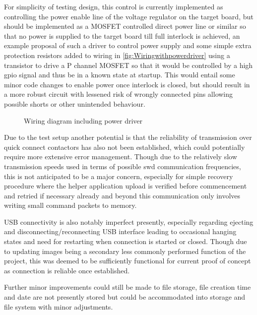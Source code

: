  For simplicity of testing design, this control is currently implemented as controlling the power enable line of the voltage regulator on the target board, but should  be implemented as a MOSFET controlled direct power line or similar so that no power is supplied to the target board till full interlock is achieved, an example proposal of such a driver to control power supply and some simple extra protection resistors added to wiring in \autoref{fig:Wiringwithpowerdriver} using a transistor to drive a P channel MOSFET so that it would be controlled by a high \gls{gpio} signal and thus be in a known state at startup. This would entail some minor code changes to enable power once interlock is closed, but should result in a more robust circuit with lessened risk of wrongly connected pins allowing possible shorts or other unintended behaviour.

\begin{figure}[ht]
	\centering
	\caption{Wiring diagram including power driver}
	\label{fig:Wiringwithpowerdriver}
\end{figure}

Due to the test setup another potential is that the reliability of transmission over quick connect contactors has also not been established, which could potentially require more extensive error management. Though due to the relatively slow transmission speeds used in terms of possible \gls{swd} communication frequencies, this is not anticipated to be a major concern, especially for simple recovery procedure where the helper application upload is verified before commencement and retried if necessary already and beyond this communication only involves writing small command packets to memory.

USB connectivity is also notably imperfect presently, especially regarding ejecting and disconnecting/reconnecting USB interface leading to occasional hanging states and need for restarting when connection is started or closed. Though due to updating images being a secondary less commonly performed function of the project, this was deemed to be sufficiently functional for current proof of concept as connection is reliable once established.

Further minor improvements could still be made to file storage, file creation time and date are not presently stored but could be accommodated into storage and file system with minor adjustments.